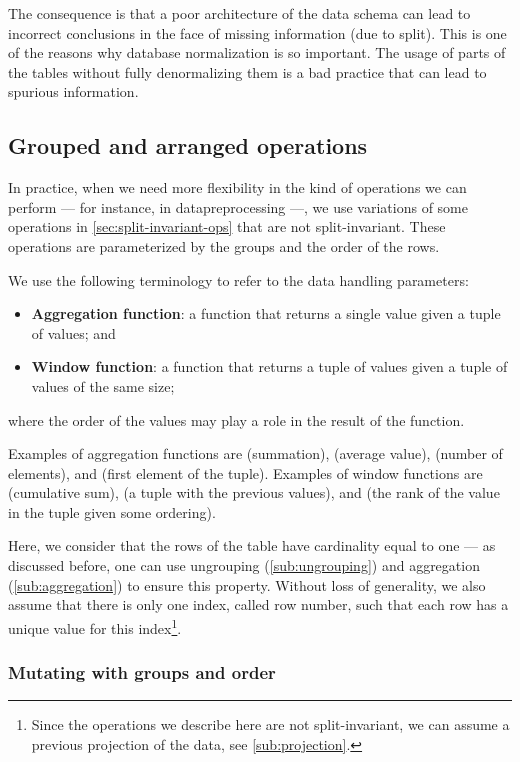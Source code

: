 The consequence is that a poor architecture of the data schema can lead to
incorrect conclusions in the face of missing information (due to split).  This is one of
the reasons why database normalization is so important.  The usage of parts of the tables
without fully denormalizing them is a bad practice that can lead to spurious information.

\subsection{Grouped and arranged operations}
\label{sub:grouped-arranged}

In practice, when we need more flexibility in the kind of operations we can perform ---
for instance, in \gls{datapreprocessing} ---, we use variations of some operations in
\cref{sec:split-invariant-ops} that are not split-invariant.  These operations are
parameterized by the groups and the order of the rows.

We use the following terminology to refer to the data handling parameters:
\begin{itemize}
  \itemsep0em
  \item \textbf{Aggregation function}: a function that returns a single value given a
    tuple of values; and
  \item \textbf{Window function}: a function that returns a tuple of values given a tuple
    of values of the same size;
\end{itemize}
where the order of the values may play a role in the result of the function.

Examples of aggregation functions are  (summation),  (average value),
 (number of elements), and  (first element of the tuple). Examples
of window functions are  (cumulative sum),  (a tuple with the
previous values), and  (the rank of the value in the tuple given some
ordering).

Here, we consider that the rows of the table have cardinality equal to one --- as
discussed before, one can use ungrouping (\cref{sub:ungrouping}) and aggregation
(\cref{sub:aggregation}) to ensure this property.  Without loss of generality, we also
assume that there is only one index, called row number, such that each row has a unique
value for this index\footnote{Since the operations we describe here are not
split-invariant, we can assume a previous projection of the data, see
\cref{sub:projection}.}.

\subsubsection{Mutating with groups and order}

